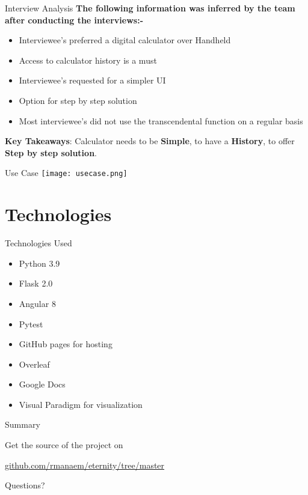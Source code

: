 \documentclass{beamer}
\begin{document}
\begin{frame}{Interview Analysis}
	\textbf{The following information was inferred by the team after conducting the interviews:-}
	\begin{itemize}
		\item Interviewee's preferred a digital calculator over Handheld
		\item Access to calculator history is a must
		\item Interviewee's requested for a simpler UI 
		\item Option for step by step solution
		\item Most interviewee's did not use the transcendental function on a regular basis
	\end{itemize}
	\textbf{Key Takeaways}: Calculator needs to be \textbf{Simple}, to have a \textbf{History}, to offer \textbf{Step by step solution}.
\end{frame}

\begin{frame}{Use Case}
	\vspace*{-1.5mm}    
    \hspace*{-11mm}
    \texttt{[image: usecase.png]}
\end{frame}


\section{Technologies}

\begin{frame}[fragile]{Technologies Used}
      \begin{itemize}
          \item Python 3.9
          \item Flask 2.0
          \item Angular 8
          \item Pytest
          \item GitHub pages for hosting
          \item Overleaf
          \item Google Docs
          \item Visual Paradigm for visualization
      \end{itemize}
\end{frame}


\begin{frame}{Summary}

  Get the source of the project on 

  \begin{center}\url{github.com/rmanaem/eternity/tree/master}\end{center}

  \begin{center}\ccbysa\end{center}

\end{frame}

{
\begin{frame}[standout]
  Questions?
\end{frame}
}
\end{document}
